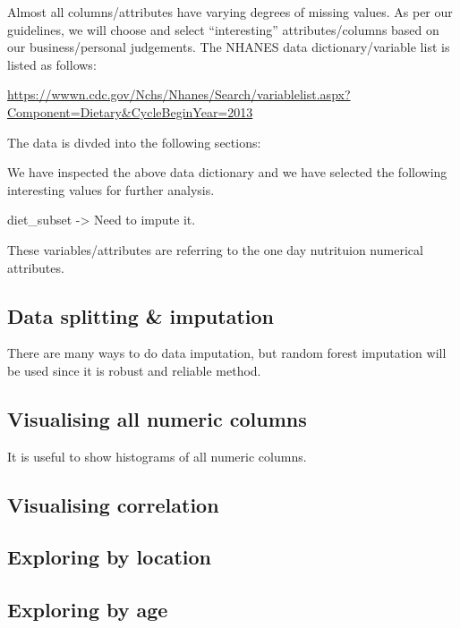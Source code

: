 \documentclass[]{article}
\begin{document}
Almost all columns/attributes have varying degrees of missing values. As
per our guidelines, we will choose and select ``interesting''
attributes/columns based on our business/personal judgements. The NHANES
data dictionary/variable list is listed as follows:

\url{https://wwwn.cdc.gov/Nchs/Nhanes/Search/variablelist.aspx?Component=Dietary\&CycleBeginYear=2013}

The data is divded into the following sections:

We have inspected the above data dictionary and we have selected the
following interesting values for further analysis.

diet\_subset -\textgreater{} Need to impute it.

These variables/attributes are referring to the one day nutrituion
numerical attributes.

\hypertarget{data-splitting-imputation}{%
\subsection{Data splitting \&
imputation}\label{data-splitting-imputation}}

There are many ways to do data imputation, but random forest imputation
will be used since it is robust and reliable method.

\hypertarget{visualising-all-numeric-columns}{%
\subsection{Visualising all numeric
columns}\label{visualising-all-numeric-columns}}

It is useful to show histograms of all numeric columns.

\hypertarget{visualising-correlation}{%
\subsection{Visualising correlation}\label{visualising-correlation}}

\hypertarget{exploring-by-location}{%
\subsection{Exploring by location}\label{exploring-by-location}}

\hypertarget{exploring-by-age}{%
\subsection{Exploring by age}\label{exploring-by-age}}
\end{document}
